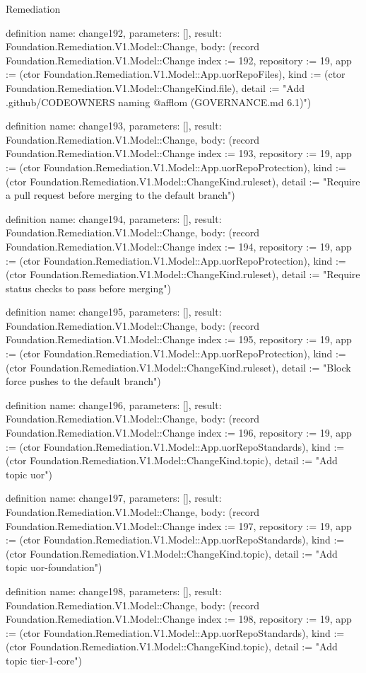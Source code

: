 \begin{lexlean}{Remediation}
\begin{semanticmodule}
definition{
  name: change192,
  parameters: [],
  result: Foundation.Remediation.V1.Model::Change,
  body: (record Foundation.Remediation.V1.Model::Change {index := 192, repository := 19, app := (ctor Foundation.Remediation.V1.Model::App.uorRepoFiles), kind := (ctor Foundation.Remediation.V1.Model::ChangeKind.file), detail := "Add .github/CODEOWNERS naming @afflom (GOVERNANCE.md 6.1)"})
}

definition{
  name: change193,
  parameters: [],
  result: Foundation.Remediation.V1.Model::Change,
  body: (record Foundation.Remediation.V1.Model::Change {index := 193, repository := 19, app := (ctor Foundation.Remediation.V1.Model::App.uorRepoProtection), kind := (ctor Foundation.Remediation.V1.Model::ChangeKind.ruleset), detail := "Require a pull request before merging to the default branch"})
}

definition{
  name: change194,
  parameters: [],
  result: Foundation.Remediation.V1.Model::Change,
  body: (record Foundation.Remediation.V1.Model::Change {index := 194, repository := 19, app := (ctor Foundation.Remediation.V1.Model::App.uorRepoProtection), kind := (ctor Foundation.Remediation.V1.Model::ChangeKind.ruleset), detail := "Require status checks to pass before merging"})
}

definition{
  name: change195,
  parameters: [],
  result: Foundation.Remediation.V1.Model::Change,
  body: (record Foundation.Remediation.V1.Model::Change {index := 195, repository := 19, app := (ctor Foundation.Remediation.V1.Model::App.uorRepoProtection), kind := (ctor Foundation.Remediation.V1.Model::ChangeKind.ruleset), detail := "Block force pushes to the default branch"})
}

definition{
  name: change196,
  parameters: [],
  result: Foundation.Remediation.V1.Model::Change,
  body: (record Foundation.Remediation.V1.Model::Change {index := 196, repository := 19, app := (ctor Foundation.Remediation.V1.Model::App.uorRepoStandards), kind := (ctor Foundation.Remediation.V1.Model::ChangeKind.topic), detail := "Add topic uor"})
}

definition{
  name: change197,
  parameters: [],
  result: Foundation.Remediation.V1.Model::Change,
  body: (record Foundation.Remediation.V1.Model::Change {index := 197, repository := 19, app := (ctor Foundation.Remediation.V1.Model::App.uorRepoStandards), kind := (ctor Foundation.Remediation.V1.Model::ChangeKind.topic), detail := "Add topic uor-foundation"})
}

definition{
  name: change198,
  parameters: [],
  result: Foundation.Remediation.V1.Model::Change,
  body: (record Foundation.Remediation.V1.Model::Change {index := 198, repository := 19, app := (ctor Foundation.Remediation.V1.Model::App.uorRepoStandards), kind := (ctor Foundation.Remediation.V1.Model::ChangeKind.topic), detail := "Add topic tier-1-core"})
}


\end{semanticmodule}
\end{lexlean}
